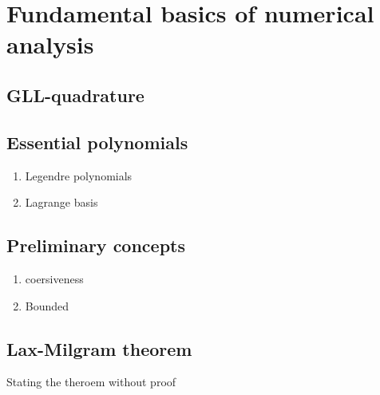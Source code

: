 
\chapter{Fundamental basics of numerical analysis} %

\label{AppendixA} %


\section{GLL-quadrature}
\section{Essential polynomials}
\begin{enumerate}
    \item Legendre polynomials
    \item Lagrange basis 
\end{enumerate}

\section{Preliminary concepts}

\begin{enumerate}
    \item coersiveness
    \item Bounded  
\end{enumerate}

\section{Lax-Milgram theorem}

Stating the theroem without proof 

